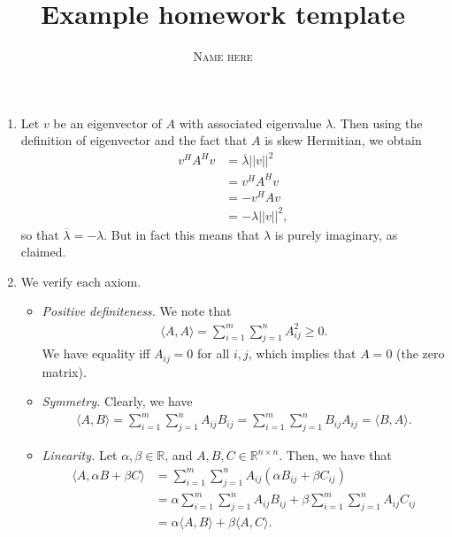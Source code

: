 \documentclass{article}
\title{Example homework template}
\author{\textsc{Name here}}
\newcommand{\RR}{\mathbb{R}}
\newcommand{\ol}{\overline}
\begin{document}
\maketitle

\begin{enumerate}
      \item  Let $v$ be an eigenvector of $A$ with associated eigenvalue $\lambda$.  Then using the definition of eigenvector and the fact that $A$ is skew Hermitian, we obtain
    \begin{align*}
      v^H A^H v &= \ol{\lambda} || v||^2 \\
      & = v^H A^H v  \\
      &= - v^H A v \\
      &= - \lambda || v||^2,
    \end{align*}
    so that $\ol{\lambda} = - \lambda$.  But in fact this means that $\lambda$ is purely imaginary, as claimed.
  \item We verify each axiom.
    \begin{itemize}
      \item {\it Positive definiteness.} We note that
        \begin{align*}
          \langle A, A\rangle = \sum_{i=1}^{m} \sum_{j=1}^{n} A_{ij}^2 \geq 0.
        \end{align*}
        We have equality iff $A_{ij} = 0$ for all $i, j$, which implies that $A = 0$ (the zero matrix).
      \item {\it Symmetry.} Clearly, we have
        \begin{align*}
          \langle A, B\rangle = \sum_{i=1}^{m} \sum_{j=1}^{n} A_{ij} B_{ij} = \sum_{i=1}^{m}\sum_{j=1}^{n} B_{ij} A_{ij} = \langle B, A\rangle.
        \end{align*}

      \item {\it Linearity.} Let $\alpha, \beta \in \RR$, and $A, B, C \in \RR^{n \times n}$.  Then, we have that
        \begin{align*}
          \langle A, \alpha B + \beta C\rangle &= \sum_{i=1}^{m} \sum_{j=1}^{n} A_{ij} \left( \alpha B_{ij} + \beta C_{ij} \right) \\
          &= \alpha \sum_{i=1}^{m} \sum_{j=1}^{n} A_{ij} B_{ij} + \beta \sum_{i=1}^{m} \sum_{j=1}^{n} A_{ij} C_{ij} \\
          &= \alpha \langle A, B\rangle + \beta \langle A, C\rangle.
        \end{align*}
    \end{itemize}


\end{enumerate}
\end{document}
